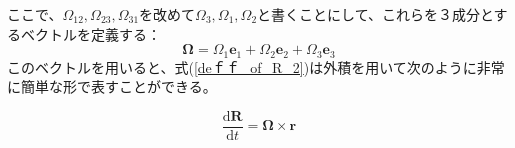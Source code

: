 \documentclass[twocolumn,a4j,10pt]{jarticle}
\begin{document}
ここで、$\Omega_{12},\Omega_{23},\Omega_{31}$を改めて$\Omega_{3},\Omega_{1},\Omega_{2}$と書くことにして、これらを３成分とするベクトルを定義する：
\begin{equation}
  \bm{\Omega} = \Omega_1 \bm{e}_1 + \Omega_2 \bm{e}_2 + \Omega_3 \bm{e}_3
  \label{angular_speed}
\end{equation}
このベクトルを用いると、式(\ref{deｆｆ_of_R_2})は外積を用いて次のように非常に簡単な形で表すことができる。

\begin{equation}
  \frac{\mathrm{d} \bm{R}}{\mathrm{d} t} = \bm{\Omega} \times \bm{r}
  \label{angular_speed}
\end{equation}
\end{document}
